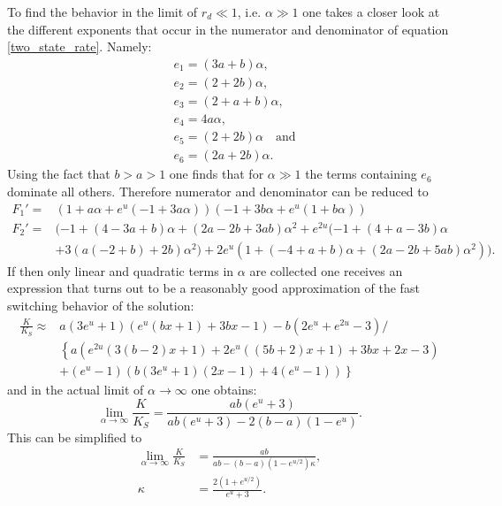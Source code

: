 To find the behavior in the limit of $r_d \ll 1 $, i.e. $\alpha \gg 1$ one takes a closer look at the different exponents that occur in the numerator and denominator of equation \eqref{two_state_rate}. Namely:
\begin{align}
& e_1 = (3a+b)\alpha, \nonumber \\
& e_2 = (2+2b)\alpha, \nonumber \\
& e_3 = (2+a+b)\alpha, \nonumber \\
& e_4 = 4a\alpha, \nonumber \\
& e_5 = (2+2b)\alpha \quad \textrm{and} \nonumber \\
& e_6 = (2a+2b)\alpha.
\end{align}
Using the fact that $b > a > 1$ one finds that for $\alpha \gg 1$ the terms containing $e_6$ dominate all others. Therefore numerator and denominator can be reduced to
\begin{align*}
    F_1' =& ( 1 + a \alpha + e^u (-1 + 3 a \alpha)) (-1 + 3 b \alpha + e^u (1 + b \alpha))\\
    F_2' =& (-1 + (4 - 3 a + b) \alpha + (2 a - 2 b + 3 a b) \alpha^2 + e^{2 u} (-1 + (4 + a - 3 b) \alpha \\
          &+ 3 (a (-2 + b) + 2 b) \alpha^2) + 2 e^u (1 + (-4 + a + b) \alpha + (2 a - 2 b + 5 a b) \alpha^2)).
\end{align*}
If then only linear and quadratic terms in $\alpha$ are collected one receives an expression that turns out to be a reasonably good approximation of the fast switching behavior of the solution: 
\begin{align}
    \frac{K}{K_{S}} \approx &a \left(3 e^u+1\right) \left(e^u (b x+1)+3 b x-1\right)-b \left(2 e^u+e^{2 u}-3\right) / \nonumber \\
                          &\left\{a \left(e^{2 u} (3 (b-2) x+1)+2 e^u ((5 b+2) x+1)+3 b x+2 x-3\right) \right.  \nonumber \\
                          & \left. +\left(e^u-1\right) \left(b \left(3 e^u+1\right) (2 x-1)+4 \left(e^u-1\right)\right) \right\}
    \label{kla}
\end{align}
and in the actual limit of $\alpha \rightarrow \infty$ one obtains: 
\begin{equation}
    \lim_{\alpha \rightarrow \infty} \frac{K}{K_{S}} = \frac{a b \left(e^u+3\right)}{ab \left(e^u+3\right)-2(b-a)(1-e^u)}.
    \label{kliminfa}
\end{equation}
This can be simplified to 
\begin{align}
    \lim_{\alpha \rightarrow \infty} \frac{K}{K_S} &= \frac{ab}{ab - (b-a)(1-e^{u/2}) \kappa}, \\
    \kappa &= \frac{2(1+e^{u/2})}{e^u + 3}.
    \label{K_fast_limit_2}
\end{align}
